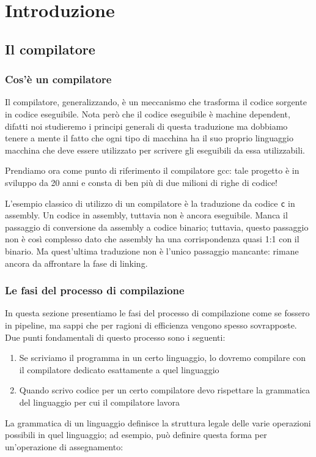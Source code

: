 \documentclass[class=book, crop=false, oneside]{standalone}
\begin{document}
\chapter{Introduzione}

\section{Il compilatore}
\subsection{Cos'è un compilatore}
Il compilatore, generalizzando, è un meccanismo che trasforma il codice sorgente in codice eseguibile.
Nota però che il codice eseguibile è machine dependent, difatti noi studieremo i principi generali di questa traduzione ma dobbiamo tenere a mente il fatto che ogni tipo di macchina ha il suo proprio linguaggio macchina che deve essere utilizzato per scrivere gli eseguibili da essa utilizzabili.


Prendiamo ora come punto di riferimento il compilatore gcc: tale progetto è in sviluppo da 20 anni e consta di ben più di due milioni di righe di codice!


L’esempio classico di utilizzo di un compilatore è la traduzione da codice \texttt{c} in assembly.
Un codice in assembly, tuttavia non è ancora eseguibile. Manca il passaggio di conversione da assembly a codice binario; tuttavia, questo passaggio non è così complesso dato che assembly ha una corrispondenza quasi 1:1 con il binario.
Ma quest’ultima traduzione non è l’unico passaggio mancante: rimane ancora da affrontare la fase di linking.

\subsection{Le fasi del processo di compilazione}
In questa sezione presentiamo le fasi del processo di compilazione come se fossero in pipeline, ma sappi che per ragioni di efficienza vengono spesso sovrapposte. Due punti fondamentali di questo processo sono i seguenti:
\begin{enumerate}
    \item Se scriviamo il programma in un certo linguaggio, lo dovremo compilare con il compilatore dedicato esattamente a quel linguaggio
    \item Quando scrivo codice per un certo compilatore devo rispettare la grammatica del linguaggio per cui il compilatore lavora
\end{enumerate}
La grammatica di un linguaggio definisce la struttura legale delle varie operazioni possibili in quel linguaggio; ad esempio, può definire questa forma per un’operazione di assegnamento:
\end{document}
